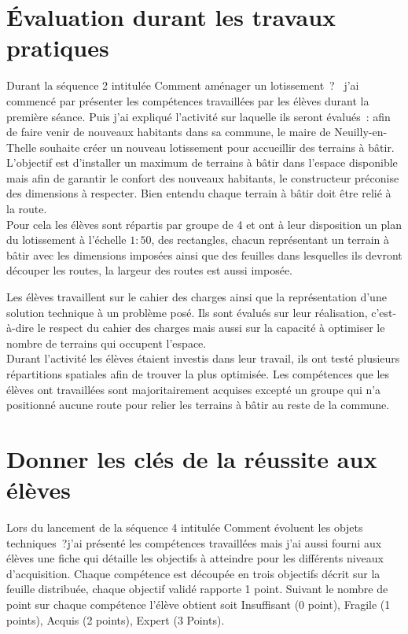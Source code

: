 
\section{Évaluation durant les travaux pratiques}

Durant la séquence 2 intitulée \og Comment aménager un lotissement~? \fg \ j'ai commencé par présenter les compétences travaillées par les élèves durant la première séance.
Puis j'ai expliqué l'activité sur laquelle ils seront évalués~: afin de faire venir de nouveaux habitants dans sa commune, le maire de Neuilly-en-Thelle souhaite créer un nouveau lotissement pour accueillir des terrains à bâtir.
L'objectif est d'installer un maximum de terrains à bâtir dans l'espace disponible mais afin de garantir le confort des nouveaux habitants, le constructeur préconise des dimensions à respecter.
Bien entendu chaque terrain à bâtir doit être relié à la route.\\

Pour cela les élèves sont répartis par groupe de 4 et ont à leur disposition un plan du lotissement à l'échelle $1:50$, des rectangles, chacun représentant un terrain à bâtir avec les dimensions imposées ainsi que des feuilles dans lesquelles ils devront découper les routes, la largeur des routes est aussi imposée.

Les élèves travaillent sur le cahier des charges ainsi que la représentation d'une solution technique à un problème posé.
Ils sont évalués sur leur réalisation, c'est-à-dire le respect du cahier des charges mais aussi sur la capacité à optimiser le nombre de terrains qui occupent l'espace.\\

Durant l'activité les élèves étaient investis dans leur travail, ils ont testé plusieurs répartitions spatiales afin de trouver la plus optimisée.
Les compétences que les élèves ont travaillées sont majoritairement acquises excepté un groupe qui n'a positionné aucune route pour relier les terrains à bâtir au reste de la commune.


\newpage
\section{Donner les clés de la réussite aux élèves}

Lors du lancement de la séquence 4 intitulée \og Comment évoluent les objets techniques~?\fg j'ai présenté les compétences travaillées mais j'ai aussi fourni aux élèves une fiche qui détaille les objectifs à atteindre pour les différents niveaux d'acquisition. 
Chaque compétence est découpée en trois objectifs décrit sur la feuille distribuée, chaque objectif validé rapporte 1 point. Suivant le nombre de point sur chaque compétence l'élève obtient soit Insuffisant (0 point), Fragile (1 points), Acquis (2 points), Expert (3 Points).


